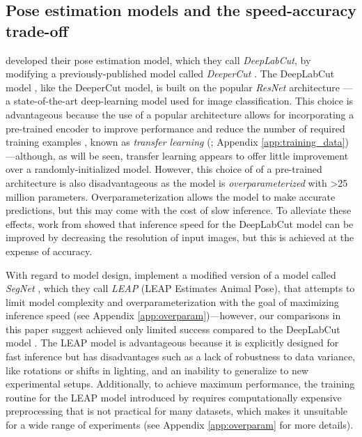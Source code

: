 \documentclass[11pt,a4paper,twoside]{book}
\begin{document}
\begin{doublespace}
\subsection{Pose estimation models and the speed-accuracy trade-off}

\cite{mathis2018deeplabcut} developed their pose estimation model, which they call \textit{DeepLabCut}, by modifying a previously-published model called \textit{DeeperCut} \citep{insafutdinov2016deepercut}. The DeepLabCut model \citep{mathis2018deeplabcut}, like the DeeperCut model, is built on the popular \textit{ResNet} architecture \citep{he2016deep}—a state-of-the-art deep-learning model used for image classification. This choice is advantageous because the use of a popular architecture allows for incorporating a pre-trained encoder to improve performance and reduce the number of required training examples \citep{mathis2018deeplabcut}, known as \textit{transfer learning} (\citealt{pratt1993discriminability}; Appendix \ref{app:training_data})---although, as will be seen, transfer learning appears to offer little improvement over a randomly-initialized model. However, this choice of of a pre-trained architecture is also disadvantageous as the model is \textit{overparameterized} with >25 million parameters. Overparameterization allows the model to make accurate predictions, but this may come with the cost of slow inference. To alleviate these effects, work from \cite{mathis2018inference} showed that inference speed for the DeepLabCut model \citep{mathis2018deeplabcut} can be improved by decreasing the resolution of input images, but this is achieved at the expense of accuracy. 

With regard to model design, \cite{pereira2019fast} implement a modified version of a model called \textit{SegNet} \citep{badrinarayanan2017segnet}, which they call \textit{LEAP} (LEAP Estimates Animal Pose), that attempts to limit model complexity and overparameterization with the goal of maximizing inference speed (see Appendix \ref{app:overparam})—however, our comparisons in this paper suggest \cite{pereira2019fast} achieved only limited success compared to the DeepLabCut model \citep{mathis2018deeplabcut}. The LEAP model is advantageous because it is explicitly designed for fast inference but has disadvantages such as a lack of robustness to data variance, like rotations or shifts in lighting, and an inability to generalize to new experimental setups. Additionally, to achieve maximum performance, the training routine for the LEAP model introduced by \cite{pereira2019fast} requires computationally expensive preprocessing that is not practical for many datasets, which makes it unsuitable for a wide range of experiments (see Appendix \ref{app:overparam} for more details).


\end{doublespace}
\end{document}
